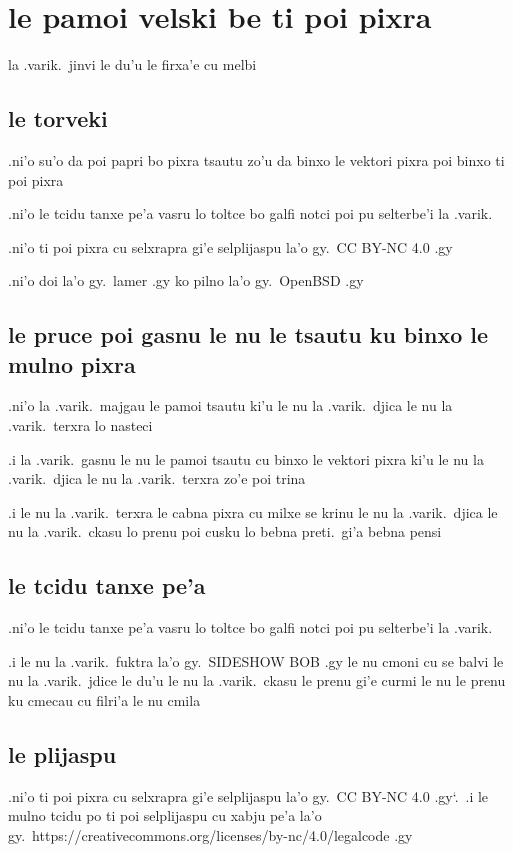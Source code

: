 \documentclass{report}
\newcommand\sds{\spacefactor\sfcode`.\ \space}
\begin{document}
\section{le pamoi velski be ti poi pixra}
la .varik.\ jinvi le du'u le firxa'e cu melbi

\subsection{le torveki}
.ni'o su'o da poi papri bo pixra tsautu zo'u da binxo le vektori pixra poi binxo ti poi pixra

.ni'o le tcidu tanxe pe'a vasru lo toltce bo galfi notci poi pu selterbe'i la .varik.

.ni'o ti poi pixra cu selxrapra gi'e selplijaspu la'o gy.\ CC BY-NC 4.0 .gy

.ni'o doi la'o gy.\ lamer .gy ko pilno la'o gy.\ OpenBSD .gy

\subsection{le pruce poi gasnu le nu le tsautu ku binxo le mulno pixra}
.ni'o la .varik.\ majgau le pamoi tsautu ki'u le nu la .varik.\ djica le nu la .varik.\ terxra lo nasteci

.i la .varik.\ gasnu le nu le pamoi tsautu cu binxo le vektori pixra ki'u le nu la .varik.\ djica le nu la .varik.\ terxra zo'e poi trina

.i le nu la .varik.\ terxra le cabna pixra cu milxe se krinu le nu la .varik.\ djica le nu la .varik.\ ckasu lo prenu poi cusku lo bebna preti.\ gi'a bebna pensi

\subsection{le tcidu tanxe pe'a}
.ni'o le tcidu tanxe pe'a vasru lo toltce bo galfi notci poi pu selterbe'i la .varik.

.i le nu la .varik.\ fuktra la'o gy.\ SIDESHOW BOB .gy le nu cmoni cu se balvi le nu la .varik.\ jdice le du'u le nu la .varik.\ ckasu le prenu gi'e curmi le nu le prenu ku cmecau cu filri'a le nu cmila

\subsection{le plijaspu}
.ni'o ti poi pixra cu selxrapra gi'e selplijaspu la'o gy.\ CC BY-NC 4.0 .gy\sds  .i le mulno tcidu po ti poi selplijaspu cu xabju pe'a la'o gy.\ https://creativecommons.org/licenses/by-nc/4.0/legalcode .gy
\end{document}
